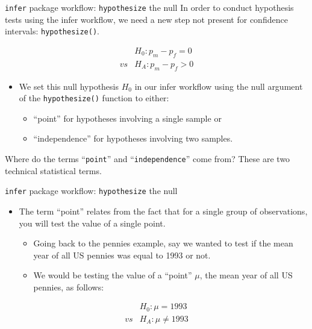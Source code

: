 \documentclass[
  ignorenonframetext,
]{beamer}
\providecommand{\tightlist}{%
  \setlength{\itemsep}{0pt}\setlength{\parskip}{0pt}}
\begin{document}
\begin{frame}[fragile]{\texttt{infer} package workflow:
\texttt{hypothesize} the null}
\label{infer-package-workflow-hypothesize-the-null}
In order to conduct hypothesis tests using the infer workflow, we need a
new step not present for confidence intervals: \texttt{hypothesize()}.

\[\begin{array}{ll}
&H_0: p_m-p_f=0\\
vs&H_A: p_m-p_f>0
\end{array}\]

\begin{itemize}
\item
  We set this null hypothesis \(H_0\) in our infer workflow using the
  null argument of the \texttt{hypothesize()} function to either:

  \begin{itemize}
  \tightlist
  \item
    ``point'' for hypotheses involving a single sample or
  \item
    ``independence'' for hypotheses involving two samples.
  \end{itemize}
\end{itemize}

Where do the terms ``\texttt{point}'' and ``\texttt{independence}'' come
from? These are two technical statistical terms.
\end{frame}

\begin{frame}{\texttt{infer} package workflow: \texttt{hypothesize} the
null}
\label{infer-package-workflow-hypothesize-the-null-1}
\begin{itemize}
\item
  The term ``point'' relates from the fact that for a single group of
  observations, you will test the value of a single point.

  \begin{itemize}
  \tightlist
  \item
    Going back to the pennies example, say we wanted to test if the mean
    year of all US pennies was equal to 1993 or not.
  \item
    We would be testing the value of a ``point'' \(\mu\), the mean year
    of all US pennies, as follows:
  \end{itemize}
\end{itemize}

\[\begin{array}{ll}
&H_0: \mu=1993\\
vs&H_A: \mu\neq 1993
\end{array}\]
\end{frame}
\end{document}
